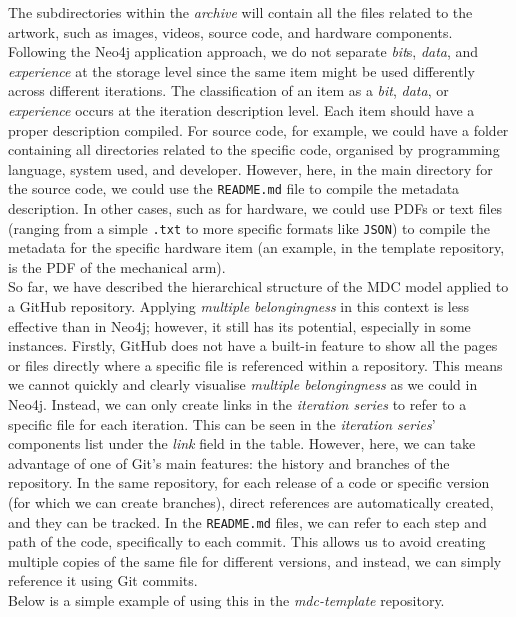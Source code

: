 The subdirectories within the \textit{archive} will contain all the files related to the artwork, such as images, videos, source code, and hardware components. Following the Neo4j application approach, we do not separate \textit{bit}s, \textit{data}, and \textit{experience} at the storage level since the same item might be used differently across different iterations. The classification of an item as a \textit{bit}, \textit{data}, or \textit{experience} occurs at the iteration description level. Each item should have a proper description compiled. For source code, for example, we could have a folder containing all directories related to the specific code, organised by programming language, system used, and developer. However, here, in the main directory for the source code, we could use the \texttt{README.md} file to compile the metadata description. In other cases, such as for hardware, we could use PDFs or text files (ranging from a simple \texttt{.txt} to more specific formats like \texttt{JSON}) to compile the metadata for the specific hardware item (an example, in the template repository, is the PDF of the mechanical arm).\\
So far, we have described the hierarchical structure of the MDC model applied to a GitHub repository. Applying \textit{multiple belongingness} in this context is less effective than in Neo4j; however, it still has its potential, especially in some instances. Firstly, GitHub does not have a built-in feature to show all the pages or files directly where a specific file is referenced within a repository. This means we cannot quickly and clearly visualise \textit{multiple belongingness} as we could in Neo4j. Instead, we can only create links in the \textit{iteration series} to refer to a specific file for each iteration. This can be seen in the \textit{iteration series}’ components list under the \textit{link} field in the table. However, here, we can take advantage of one of Git’s main features: the history and branches of the repository. In the same repository, for each release of a code or specific version (for which we can create branches), direct references are automatically created, and they can be tracked. In the \texttt{README.md} files, we can refer to each step and path of the code, specifically to each commit. This allows us to avoid creating multiple copies of the same file for different versions, and instead, we can simply reference it using Git commits.\\
Below is a simple example of using this in the \textit{mdc-template} repository.\\
